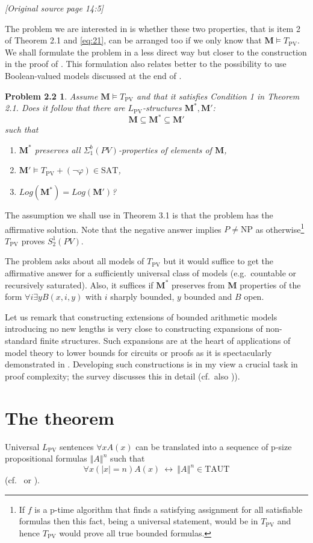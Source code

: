 \documentclass[11pt]{article}
\newcommand{\LPV}{L_{\mathrm{PV}}}
\newcommand{\TPV}{T_{\mathrm{PV}}}
\newcommand{\PV}{\mathit{PV}}
\newcommand{\TAUT}{\mathrm{TAUT}}
\newcommand{\SAT}{\mathrm{SAT}}
\newcommand{\NP}{\mathrm{NP}}
\newcommand{\Log}{\mathit{Log}}
\newcommand{\tr}[1]{\left\Vert #1\right\Vert}
\newcommand{\sourcepage}[1]{\par\Needspace{5\baselineskip}\bigskip\noindent\textit{[Original source page 14:#1]}\par\medskip}
\newtheorem*{sourceproblemtwotwo}{Problem 2.2}
\begin{document}
\sourcepage{5}
The problem we are interested in is whether these two properties, that is item 2 of Theorem 2.1 and \eqref{eq:21}, can be arranged too if we only know that $\mathbf{M}\models\TPV$. We shall formulate the problem in a less direct way but closer to the construction in the proof of \cite[Thm.9.4.2]{Kra95}. This formulation also relates better to the possibility to use Boolean-valued models discussed at the end of \cite{Kra16}.
\begin{sourceproblemtwotwo}
Assume $\mathbf{M}\models\TPV$ and that it satisfies Condition 1 in Theorem 2.1. Does it follow that there are $\LPV$-structures $\mathbf{M}^*,\mathbf{M}'$:
\[
\mathbf{M}\subseteq \mathbf{M}^*\subseteq \mathbf{M}'
\]
such that
\begin{enumerate}[label=(\arabic*)]
\item $\mathbf{M}^*$ preserves all $\Sigma^b_1(\PV)$-properties of elements of $\mathbf{M}$,
\item $\mathbf{M}'\models\TPV+(\neg\varphi)\in\SAT$,
\item $\Log(\mathbf{M}^*)=\Log(\mathbf{M}')$?
\end{enumerate}
\end{sourceproblemtwotwo}
The assumption we shall use in Theorem 3.1 is that the problem has the affirmative solution. Note that the negative answer implies $P\ne\NP$ as otherwise\footnote{If $f$ is a p-time algorithm that finds a satisfying assignment for all satisfiable formulas then this fact, being a universal statement, would be in $\TPV$ and hence $\TPV$ would prove all true bounded formulas.} $\TPV$ proves $S^1_2(\PV)$.

The problem asks about all models of $\TPV$ but it would suffice to get the affirmative answer for a sufficiently universal class of models (e.g.\ countable or recursively saturated). Also, it suffices if $\mathbf{M}^*$ preserves from $\mathbf{M}$ properties of the form $\forall i\exists yB(x,i,y)$ with $i$ sharply bounded, $y$ bounded and $B$ open.

Let us remark that constructing extensions of bounded arithmetic models introducing no new lengths is very close to constructing expansions of non-standard finite structures. Such expansions are at the heart of applications of model theory to lower bounds for circuits or proofs as it is spectacularly demonstrated in \cite{Ajt83,Ajt88}. Developing such constructions is in my view a crucial task in proof complexity; the survey \cite{Kra16} discusses this in detail (cf.\ also \cite[Chpt.20]{Kra19})).
\section{The theorem}
Universal $\LPV$ sentences $\forall xA(x)$ can be translated into a sequence of p-size propositional formulas $\tr{A}^n$ such that
\[
\forall x(|x|=n)A(x)\ \leftrightarrow\ \tr{A}^n\in\TAUT
\]
(cf.\ \cite{Kra95} or \cite[Sec.12.6]{Kra19}).
\end{document}

